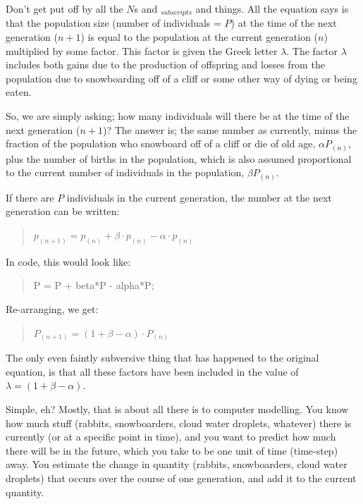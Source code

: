 \documentclass{tufte-book} %
\newenvironment{docspec}{\begin{quotation}\ttfamily\parskip0pt\parindent0pt\ignorespaces}{\end{quotation}}
\begin{document}
Don't get put off by all the \textit{\(N\)}s and \(_{subscripts}\) and things. All the equation says is that the population size (number of individuals = \textit{\(P\)}) at the time of the next generation (\(n+1\)) is equal to the population at the current generation (\(n\))  multiplied by some factor. This factor is given the Greek letter \(\lambda\). The factor \(\lambda\) includes both gains due to the production of offspring and losses from the population due to snowboarding off of a cliff or some other way of dying or being eaten.

So, we are simply asking; how many individuals will there be at the time of the next generation (\(n+1\))? The answer is; the same number as currently, minus the fraction of the population who snowboard off of a cliff or die of old age, \(\alpha\)\(P_{(n)}\), plus the number of births in the population, which is also assumed proportional to the current number of individuals in the population, \(\beta\)\(P_{(n)}\).

If there are \(P\) individuals in the current generation, the number at the next generation can be written:

\begin{docspec}
\(p_{(n+1)} = p_{(n)} + \beta\cdot p_{(n)} - \alpha\cdot p_{(n)}\)
\end{docspec}

In code, this would look like:
\begin{docspec}
P = P + beta*P - alpha*P;
\end{docspec}

Re-arranging, we get:

\begin{docspec}
\(P_{(n+1)} = (1 + \beta - \alpha)\cdot P_{(n)}\)
\end{docspec}

\noindent The only even faintly subversive thing that has happened to the original equation, is that all these factors have been included in the value of \(\lambda = (1 + \beta - \alpha)\).

Simple, eh? Mostly, that is about all there is to computer modelling. You know how much stuff (rabbits, snowboarders, cloud water droplets, whatever) there is currently (or at a specific point in time), and you want to predict how much there will be in the future, which you take to be one unit of time (time-step) away. You estimate the change in quantity (rabbits, snowboarders, cloud water droplets) that occurs over the course of one generation, and add it to the current quantity.
\end{document}

